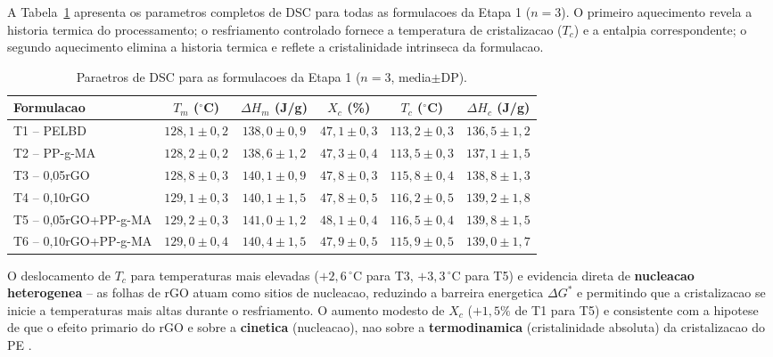 \documentclass[11pt,a4paper,oneside]{article}
\begin{document}
A Tabela~\ref{tab:dsc} apresenta os parametros completos de DSC para todas as formulacoes da Etapa 1 ($n{=}3$). O primeiro aquecimento revela a historia termica do processamento; o resfriamento controlado fornece a temperatura de cristalizacao ($T_c$) e a entalpia correspondente; o segundo aquecimento elimina a historia termica e reflete a cristalinidade intrinseca da formulacao.

\begin{table}[H]\centering
\caption{Paraetros de DSC para as formulacoes da Etapa 1 ($n{=}3$, media$\pm$DP).}\label{tab:dsc}
\begin{tabular}{lccccc}
\toprule
{\bfseries Formulacao} & {\bfseries $T_m$ ($^{\circ}$C)} & {\bfseries $\Delta H_m$ (J/g)} & {\bfseries $X_c$ (\%)} & {\bfseries $T_c$ ($^{\circ}$C)} & {\bfseries $\Delta H_c$ (J/g)} \\
\midrule
T1 -- PELBD          & $128{,}1{\pm}0{,}2$ & $138{,}0{\pm}0{,}9$ & $47{,}1{\pm}0{,}3$ & $113{,}2{\pm}0{,}3$ & $136{,}5{\pm}1{,}2$ \\
T2 -- PP-g-MA        & $128{,}2{\pm}0{,}2$ & $138{,}6{\pm}1{,}2$ & $47{,}3{\pm}0{,}4$ & $113{,}5{\pm}0{,}3$ & $137{,}1{\pm}1{,}5$ \\
T3 -- 0,05rGO        & $128{,}8{\pm}0{,}3$ & $140{,}1{\pm}0{,}9$ & $47{,}8{\pm}0{,}3$ & $115{,}8{\pm}0{,}4$ & $138{,}8{\pm}1{,}3$ \\
T4 -- 0,10rGO        & $129{,}1{\pm}0{,}3$ & $140{,}1{\pm}1{,}5$ & $47{,}8{\pm}0{,}5$ & $116{,}2{\pm}0{,}5$ & $139{,}2{\pm}1{,}8$ \\
T5 -- 0,05rGO+PP-g-MA & $129{,}2{\pm}0{,}3$ & $141{,}0{\pm}1{,}2$ & $48{,}1{\pm}0{,}4$ & $116{,}5{\pm}0{,}4$ & $139{,}8{\pm}1{,}5$ \\
T6 -- 0,10rGO+PP-g-MA & $129{,}0{\pm}0{,}4$ & $140{,}4{\pm}1{,}5$ & $47{,}9{\pm}0{,}5$ & $115{,}9{\pm}0{,}5$ & $139{,}0{\pm}1{,}7$ \\
\bottomrule
\end{tabular}
\end{table}

O deslocamento de $T_c$ para temperaturas mais elevadas ($+2{,}6\,^{\circ}$C para T3, $+3{,}3\,^{\circ}$C para T5) e evidencia direta de {\bfseries nucleacao heterogenea} -- as folhas de rGO atuam como sitios de nucleacao, reduzindo a barreira energetica $\Delta G^*$ e permitindo que a cristalizacao se inicie a temperaturas mais altas durante o resfriamento. O aumento modesto de $X_c$ ($+1{,}5\%$ de T1 para T5) e consistente com a hipotese de que o efeito primario do rGO e sobre a {\bfseries cinetica} (nucleacao), nao sobre a {\bfseries termodinamica} (cristalinidade absoluta) da cristalizacao do PE \cite{Kim2010}.
\end{document}
